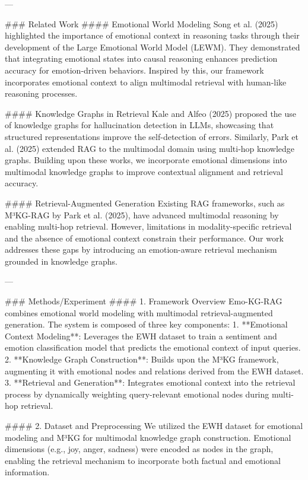 ---

### Related Work  
#### Emotional World Modeling  
Song et al. (2025) highlighted the importance of emotional context in reasoning tasks through their development of the Large Emotional World Model (LEWM). They demonstrated that integrating emotional states into causal reasoning enhances prediction accuracy for emotion-driven behaviors. Inspired by this, our framework incorporates emotional context to align multimodal retrieval with human-like reasoning processes.

#### Knowledge Graphs in Retrieval  
Kale and Alfeo (2025) proposed the use of knowledge graphs for hallucination detection in LLMs, showcasing that structured representations improve the self-detection of errors. Similarly, Park et al. (2025) extended RAG to the multimodal domain using multi-hop knowledge graphs. Building upon these works, we incorporate emotional dimensions into multimodal knowledge graphs to improve contextual alignment and retrieval accuracy.

#### Retrieval-Augmented Generation  
Existing RAG frameworks, such as M³KG-RAG by Park et al. (2025), have advanced multimodal reasoning by enabling multi-hop retrieval. However, limitations in modality-specific retrieval and the absence of emotional context constrain their performance. Our work addresses these gaps by introducing an emotion-aware retrieval mechanism grounded in knowledge graphs.

---

### Methods/Experiment  
#### 1. Framework Overview  
Emo-KG-RAG combines emotional world modeling with multimodal retrieval-augmented generation. The system is composed of three key components:  
1. **Emotional Context Modeling**: Leverages the EWH dataset to train a sentiment and emotion classification model that predicts the emotional context of input queries.  
2. **Knowledge Graph Construction**: Builds upon the M³KG framework, augmenting it with emotional nodes and relations derived from the EWH dataset.  
3. **Retrieval and Generation**: Integrates emotional context into the retrieval process by dynamically weighting query-relevant emotional nodes during multi-hop retrieval.

#### 2. Dataset and Preprocessing  
We utilized the EWH dataset for emotional modeling and M³KG for multimodal knowledge graph construction. Emotional dimensions (e.g., joy, anger, sadness) were encoded as nodes in the graph, enabling the retrieval mechanism to incorporate both factual and emotional information.

